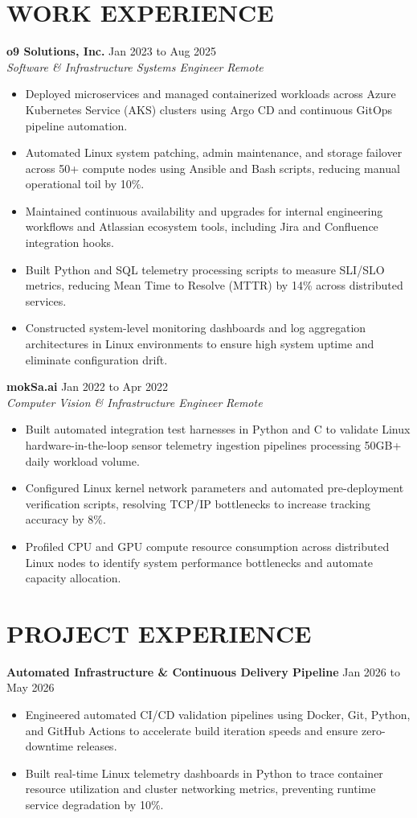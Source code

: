 \documentclass[11pt,letterpaper]{article}
\begin{document}
\section*{WORK EXPERIENCE}
\noindent\small \textbf{o9 Solutions, Inc.} \hfill Jan 2023 to Aug 2025 \\
\textit{Software \& Infrastructure Systems Engineer} \hfill \textit{Remote}
\begin{itemize}
\item Deployed microservices and managed containerized workloads across Azure Kubernetes Service (AKS) clusters using Argo CD and continuous GitOps pipeline automation.
\item Automated Linux system patching, admin maintenance, and storage failover across 50+ compute nodes using Ansible and Bash scripts, reducing manual operational toil by 10\%.
\item Maintained continuous availability and upgrades for internal engineering workflows and Atlassian ecosystem tools, including Jira and Confluence integration hooks.
\item Built Python and SQL telemetry processing scripts to measure SLI/SLO metrics, reducing Mean Time to Resolve (MTTR) by 14\% across distributed services.
\item Constructed system-level monitoring dashboards and log aggregation architectures in Linux environments to ensure high system uptime and eliminate configuration drift.
\end{itemize}
\noindent\small \textbf{mokSa.ai} \hfill Jan 2022 to Apr 2022 \\
\textit{Computer Vision \& Infrastructure Engineer} \hfill \textit{Remote}
\begin{itemize}
\item Built automated integration test harnesses in Python and C to validate Linux hardware-in-the-loop sensor telemetry ingestion pipelines processing 50GB+ daily workload volume.
\item Configured Linux kernel network parameters and automated pre-deployment verification scripts, resolving TCP/IP bottlenecks to increase tracking accuracy by 8\%.
\item Profiled CPU and GPU compute resource consumption across distributed Linux nodes to identify system performance bottlenecks and automate capacity allocation.
\end{itemize}
\section*{PROJECT EXPERIENCE}
\noindent\small \textbf{Automated Infrastructure \& Continuous Delivery Pipeline} \hfill Jan 2026 to May 2026
\begin{itemize}
\item Engineered automated CI/CD validation pipelines using Docker, Git, Python, and GitHub Actions to accelerate build iteration speeds and ensure zero-downtime releases.
\item Built real-time Linux telemetry dashboards in Python to trace container resource utilization and cluster networking metrics, preventing runtime service degradation by 10\%.
\end{itemize}
\end{document}
